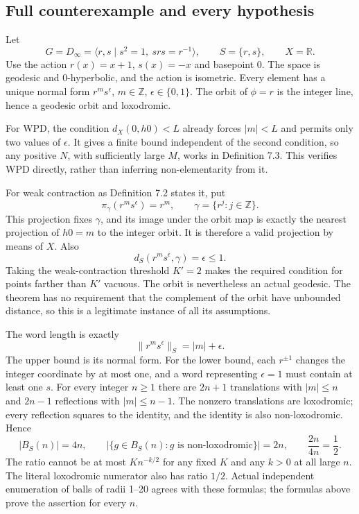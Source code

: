 \documentclass[10pt]{article}
\begin{document}
\subsection*{Full counterexample and every hypothesis}
Let \[G=D_\infty=\langle r,s\mid s^2=1,\ srs=r^{-1}\rangle,\qquad
S=\{r,s\},\qquad X=\mathbb R.\] Use the action \(r(x)=x+1\), \(s(x)=-x\) and basepoint \(0\). The space is geodesic and \(0\)-hyperbolic, and the action is isometric. Every element has a unique normal form \(r^m s^\epsilon\), \(m\in\mathbb Z\), \(\epsilon\in\{0,1\}\). The orbit of \(\phi=r\) is the integer line, hence a geodesic orbit and loxodromic.\par
For WPD, the condition \(d_X(0,h0)<L\) already forces \(|m|<L\) and permits only two values of \(\epsilon\). It gives a finite bound independent of the second condition, so any positive \(N\), with sufficiently large \(M\), works in Definition 7.3. This verifies WPD directly, rather than inferring non-elementarity from it.\par
For weak contraction as Definition 7.2 states it, put \[\pi_\gamma(r^m s^\epsilon)=r^m,\qquad \gamma=\{r^j:j\in\mathbb Z\}.\] This projection fixes \(\gamma\), and its image under the orbit map is exactly the nearest projection of \(h0=m\) to the integer orbit. It is therefore a valid projection by means of \(X\). Also \[d_S(r^m s^\epsilon,\gamma)=\epsilon\le1.\] Taking the weak-contraction threshold \(K'=2\) makes the required condition for points farther than \(K'\) vacuous. The orbit is nevertheless an actual geodesic. The theorem has no requirement that the complement of the orbit have unbounded distance, so this is a legitimate instance of all its assumptions.\par
The word length is exactly \[\|r^m s^\epsilon\|_S=|m|+\epsilon.\] The upper bound is its normal form. For the lower bound, each \(r^{\pm1}\) changes the integer coordinate by at most one, and a word representing \(\epsilon=1\) must contain at least one \(s\). For every integer \(n\ge1\) there are \(2n+1\) translations with \(|m|\le n\) and \(2n-1\) reflections with \(|m|\le n-1\). The nonzero translations are loxodromic; every reflection squares to the identity, and the identity is also non-loxodromic. Hence \[|B_S(n)|=4n,\qquad
|\{g\in B_S(n):g\text{ is non-loxodromic}\}|=2n,\qquad
\frac{2n}{4n}=\frac12.\] The ratio cannot be at most \(K n^{-k/2}\) for any fixed \(K\) and any \(k>0\) at all large \(n\). The literal loxodromic numerator also has ratio \(1/2\). Actual independent enumeration of balls of radii 1–20 agrees with these formulas; the formulas above prove the assertion for every \(n\).\par
\end{document}
